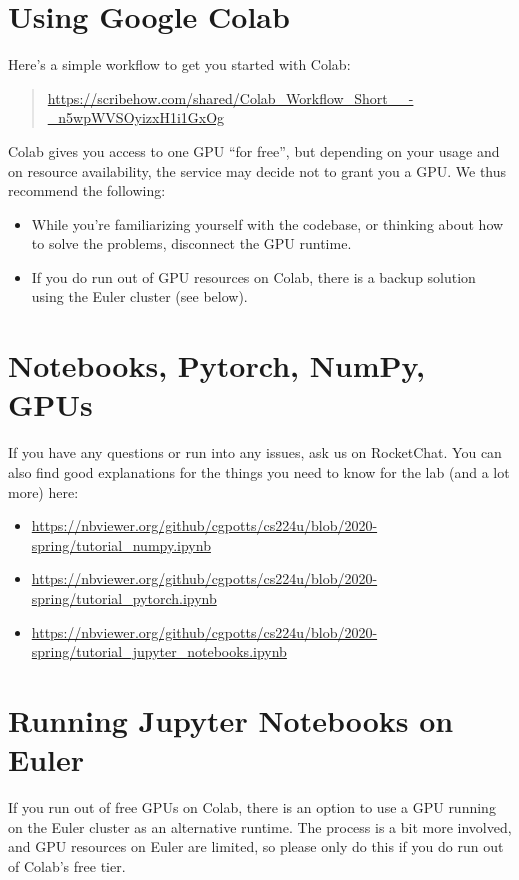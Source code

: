 \section{Using Google Colab}

Here's a simple workflow to get you started with Colab:

\begin{quote}
\url{https://scribehow.com/shared/Colab_Workflow_Short__-_n5wpWVSOyizxH1i1GxOg}
\end{quote}

\noindent Colab gives you access to one GPU ``for free'', but depending on your usage and on
resource availability, the service may decide not to grant you a GPU. We thus recommend
the following:
\begin{itemize}
	\item While you're familiarizing yourself with the codebase, or thinking about how
	to solve the problems, disconnect the GPU runtime.
	\item If you do run out of GPU resources on Colab, there is a backup solution
	using the Euler cluster (see below).
\end{itemize}

\section{Notebooks, Pytorch, NumPy, GPUs}

If you have any questions or run into any issues, ask us on RocketChat.
You can also find good explanations for the things you need to know for
the lab (and a lot more) here:
\begin{itemize}[leftmargin=1.5em]
	\item \mbox{\url{https://nbviewer.org/github/cgpotts/cs224u/blob/2020-spring/tutorial_numpy.ipynb}}
	\item \mbox{\url{https://nbviewer.org/github/cgpotts/cs224u/blob/2020-spring/tutorial_pytorch.ipynb}}
	\item \mbox{\url{https://nbviewer.org/github/cgpotts/cs224u/blob/2020-spring/tutorial_jupyter_notebooks.ipynb}}
\end{itemize}

\section{Running Jupyter Notebooks on Euler}
\label{euler}

If you run out of free GPUs on Colab, there is an option to use a GPU running on the
Euler cluster as an alternative runtime.
The process is a bit more involved, and GPU resources on Euler are limited, so please only
do this if you do run out of Colab's free tier.

